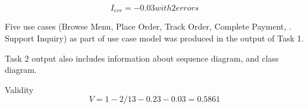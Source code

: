 \[
I_{err} = -0.03 with 2 errors
\]

Five use cases (Browse Menu, Place Order, Track Order, Complete Payment, . Support Inquiry) as part of use case model was produced in the output of Task 1. 

Task 2 output also includes information about sequence diagram, and class diagram. 

Validity
\[
V = 1 - 2/13 - 0.23 - 0.03 = 0.5861
\]